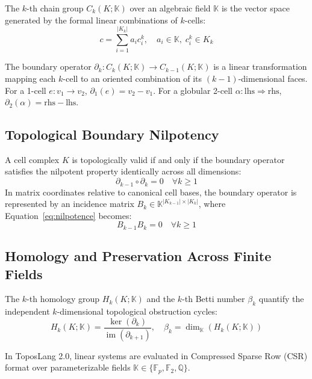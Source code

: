 \documentclass[conference]{IEEEtran}
\begin{document}
The $k$-th chain group $C_k(K; \mathbb{K})$ over an algebraic field $\mathbb{K}$ is the vector space generated by the formal linear combinations of $k$-cells:
\begin{equation}
c = \sum_{i=1}^{|K_k|} a_i c_i^k, \quad a_i \in \mathbb{K}, \; c_i^k \in K_k
\label{eq:chain}
\end{equation}

The boundary operator $\partial_k : C_k(K; \mathbb{K}) \to C_{k-1}(K; \mathbb{K})$ is a linear transformation mapping each $k$-cell to an oriented combination of its $(k-1)$-dimensional faces. For a 1-cell $e : v_1 \to v_2$, $\partial_1(e) = v_2 - v_1$. For a globular 2-cell $\alpha : \text{lhs} \Rightarrow \text{rhs}$, $\partial_2(\alpha) = \text{rhs} - \text{lhs}$.

\subsection{Topological Boundary Nilpotency}
A cell complex $K$ is topologically valid if and only if the boundary operator satisfies the nilpotent property identically across all dimensions:
\begin{equation}
\partial_{k-1} \circ \partial_k = 0 \quad \forall k \ge 1
\label{eq:nilpotence}
\end{equation}
In matrix coordinates relative to canonical cell bases, the boundary operator is represented by an incidence matrix $B_k \in \mathbb{K}^{|K_{k-1}| \times |K_k|}$, where Equation~\eqref{eq:nilpotence} becomes:
\begin{equation}
B_{k-1} B_k = 0 \quad \forall k \ge 1
\label{eq:matrix_nilpotence}
\end{equation}

\subsection{Homology and Preservation Across Finite Fields}
The $k$-th homology group $H_k(K; \mathbb{K})$ and the $k$-th Betti number $\beta_k$ quantify the independent $k$-dimensional topological obstruction cycles:
\begin{equation}
H_k(K; \mathbb{K}) = \frac{\ker(\partial_k)}{\operatorname{im}(\partial_{k+1})}, \quad \beta_k = \dim_{\mathbb{K}}(H_k(K; \mathbb{K}))
\label{eq:betti}
\end{equation}

In ToposLang 2.0, linear systems are evaluated in Compressed Sparse Row (CSR) format over parameterizable fields $\mathbb{K} \in \{\mathbb{F}_p, \mathbb{F}_2, \mathbb{Q}\}$.
\end{document}

